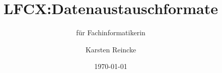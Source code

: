 \documentclass[]{beamer}
\title{LFCX:Datenaustauschformate}
\subtitle{für Fachinformatikerin}
\institute[GS-LDK]{Gewerbliche Schulen Dillenburg}
\author{Karsten Reincke}
\date{\today}
\def\cfgGl{../../../cfg.gl/}
\begin{document}

\begin{frame}
  \titlepage

  
\end{frame}






\logo{}
\newpage



%
\end{document}
